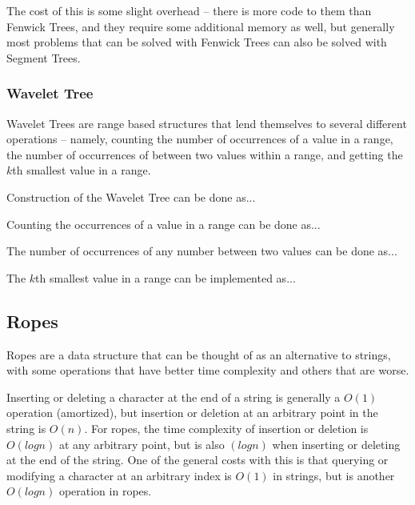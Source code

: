 The cost of this is some slight overhead -- there is more code to them than Fenwick Trees, and they require some additional memory as well, but generally most problems that can be solved with Fenwick Trees can also be solved with Segment Trees.

\subsubsection{Wavelet Tree}

Wavelet Trees are range based structures that lend themselves to several different operations -- namely, counting the number of occurrences of a value in a range, the number of occurrences of between two values within a range, and getting the $k$th smallest value in a range.

Construction of the Wavelet Tree can be done as...

Counting the occurrences of a value in a range can be done as...

The number of occurrences of any number between two values can be done as...

The $k$th smallest value in a range can be implemented as...

\subsection{Ropes}

Ropes are a data structure that can be thought of as an alternative to strings, with some operations that have better time complexity and others that are worse.

Inserting or deleting a character at the end of a string is generally a $O(1)$ operation (amortized), but insertion or deletion at an arbitrary point in the string is $O(n)$. For ropes, the time complexity of insertion or deletion is $O(log n)$ at any arbitrary point, but is also $(log n)$ when inserting or deleting at the end of the string. One of the general costs with this is that querying or modifying a character at an arbitrary index is $O(1)$ in strings, but is another $O(log n)$ operation in ropes.